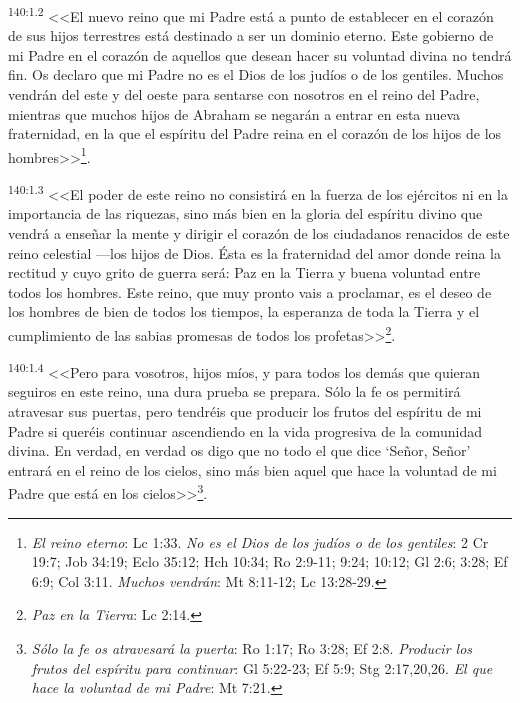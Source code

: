 \par 
\textsuperscript{140:1.2} <<El nuevo reino que mi Padre está a punto de establecer en el corazón de sus hijos terrestres está destinado a ser un dominio eterno. Este gobierno de mi Padre en el corazón de aquellos que desean hacer su voluntad divina no tendrá fin. Os declaro que mi Padre no es el Dios de los judíos o de los gentiles. Muchos vendrán del este y del oeste para sentarse con nosotros en el reino del Padre, mientras que muchos hijos de Abraham se negarán a entrar en esta nueva fraternidad, en la que el espíritu del Padre reina en el corazón de los hijos de los hombres>>\footnote{\textit{El reino eterno}: Lc 1:33. \textit{No es el Dios de los judíos o de los gentiles}: 2 Cr 19:7; Job 34:19; Eclo 35:12; Hch 10:34; Ro 2:9-11; 9:24; 10:12; Gl 2:6; 3:28; Ef 6:9; Col 3:11. \textit{Muchos vendrán}: Mt 8:11-12; Lc 13:28-29.}.

\par 
\textsuperscript{140:1.3} <<El poder de este reino no consistirá en la fuerza de los ejércitos ni en la importancia de las riquezas, sino más bien en la gloria del espíritu divino que vendrá a enseñar la mente y dirigir el corazón de los ciudadanos renacidos de este reino celestial ---los hijos de Dios. Ésta es la fraternidad del amor donde reina la rectitud y cuyo grito de guerra será: Paz en la Tierra y buena voluntad entre todos los hombres. Este reino, que muy pronto vais a proclamar, es el deseo de los hombres de bien de todos los tiempos, la esperanza de toda la Tierra y el cumplimiento de las sabias promesas de todos los profetas>>\footnote{\textit{Paz en la Tierra}: Lc 2:14.}.

\par 
\textsuperscript{140:1.4} <<Pero para vosotros, hijos míos, y para todos los demás que quieran seguiros en este reino, una dura prueba se prepara. Sólo la fe os permitirá atravesar sus puertas, pero tendréis que producir los frutos del espíritu de mi Padre si queréis continuar ascendiendo en la vida progresiva de la comunidad divina. En verdad, en verdad os digo que no todo el que dice `Señor, Señor' entrará en el reino de los cielos, sino más bien aquel que hace la voluntad de mi Padre que está en los cielos>>\footnote{\textit{Sólo la fe os atravesará la puerta}: Ro 1:17; Ro 3:28; Ef 2:8. \textit{Producir los frutos del espíritu para continuar}: Gl 5:22-23; Ef 5:9; Stg 2:17,20,26. \textit{El que hace la voluntad de mi Padre}: Mt 7:21.}.

